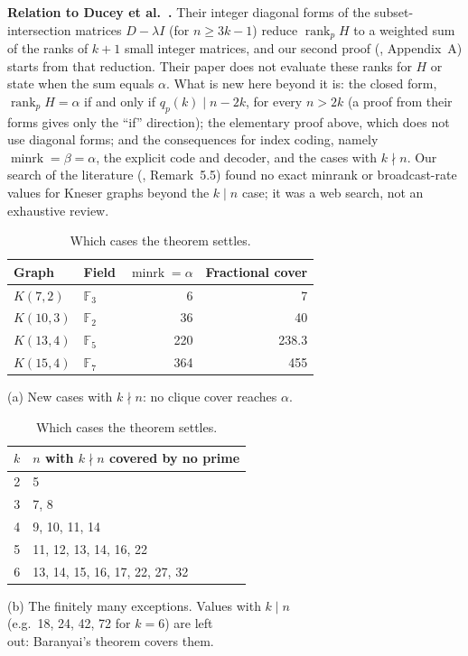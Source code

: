 \textbf{Relation to Ducey et al.~\cite{ducey}.} Their integer diagonal forms of the subset-intersection matrices
$D-\lambda I$ (for $n\ge3k-1$) reduce $\operatorname{rank}_pH$ to a weighted sum of the ranks of $k+1$ small
integer matrices, and our second proof (, Appendix~A) starts from that reduction. Their paper does
not evaluate these ranks for $H$ or state when the sum equals $\alpha$. What is new here beyond it is: the closed
form, $\operatorname{rank}_pH=\alpha$ if and only if $q_p(k)\mid n-2k$, for every $n>2k$ (a proof from their forms gives only
the ``if'' direction); the elementary proof above, which does not use diagonal forms; and
the consequences for index coding, namely $\operatorname{minrk}=\beta=\alpha$, the explicit code and decoder, and the
cases with $k\nmid n$. Our search of the literature (, Remark~5.5) found no exact minrank or
broadcast-rate values for Kneser graphs beyond the $k\mid n$ case; it was a web search, not an exhaustive review.

\begin{table}[ht]
  \centering\small
  \begin{minipage}[t]{0.52\textwidth}\centering
    \begin{tabular}{@{}llrr@{}}
      \toprule
      Graph & Field & $\operatorname{minrk}=\alpha$ & Fractional cover \\
      \midrule
      $K(7,2)$  & $\mathbb{F}_3$ & 6   & 7 \\
      $K(10,3)$ & $\mathbb{F}_2$ & 36  & 40 \\
      $K(13,4)$ & $\mathbb{F}_5$ & 220 & 238.3 \\
      $K(15,4)$ & $\mathbb{F}_7$ & 364 & 455 \\
      \bottomrule
    \end{tabular}\par\smallskip
    (a) New cases with $k\nmid n$: no clique cover reaches $\alpha$.
  \end{minipage}\hfill
  \begin{minipage}[t]{0.44\textwidth}\centering
    \begin{tabular}{@{}cl@{}}
      \toprule
      $k$ & \makecell{$n$ with $k\nmid n$ covered\\by no prime} \\
      \midrule
      2 & 5 \\
      3 & 7, 8 \\
      4 & 9, 10, 11, 14 \\
      5 & 11, 12, 13, 14, 16, 22 \\
      6 & 13, 14, 15, 16, 17, 22, 27, 32 \\
      \bottomrule
    \end{tabular}\par\smallskip
    (b) The finitely many exceptions. Values with $k\mid n$\\ (e.g.\ 18, 24, 42, 72 for $k=6$) are left\\ out: Baranyai's theorem covers them.
  \end{minipage}
  \caption{Which cases the theorem settles.}
  \label{tab:newcases}
\end{table}

